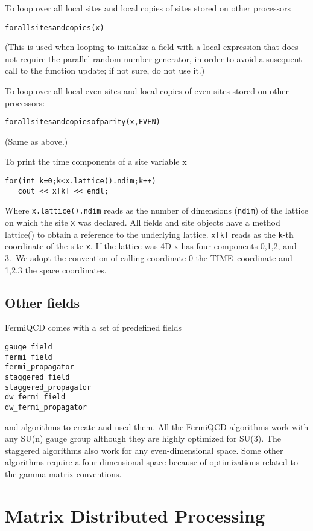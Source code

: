To loop over all local sites and local copies of sites stored on other
processors
\begin{verbatim}
forallsitesandcopies(x)
\end{verbatim}

(This is used when looping to initialize a field with a local expression
that does not require the parallel random number generator, in order to
avoid a susequent call to the function update; if not sure, do not use it.)

To loop over all local even sites and local copies of even sites stored on
other processors:
\begin{verbatim}
forallsitesandcopiesofparity(x,EVEN)
\end{verbatim}

(Same as above.)

To print the time components of a site variable x
\begin{verbatim}
for(int k=0;k<x.lattice().ndim;k++)
   cout << x[k] << endl;
\end{verbatim}

Where {\tt x.lattice().ndim} reads as the number of dimensions ({\tt ndim})
of the lattice on which the site {\tt x} was declared. All fields and site
objects have a method lattice() to obtain a reference to the underlying
lattice. {\tt x[k]} reads as the {\tt k}-th coordinate of the site {\tt x}.
If the lattice was 4D x has four components 0,1,2, and 3.\ We adopt the
convention of calling coordinate 0 the TIME\ coordinate and 1,2,3 the space
coordinates.

\subsection{Other fields}

FermiQCD comes with a set of predefined fields
\begin{verbatim}
gauge_field
fermi_field
fermi_propagator
staggered_field
staggered_propagator
dw_fermi_field
dw_fermi_propagator
\end{verbatim}

and algorithms to create and used them. All the FermiQCD algorithms work
with any SU(n) gauge group although they are highly optimized for SU(3). The
staggered algorithms also work for any even-dimensional space. Some other
algorithms require a four dimensional space because of optimizations related
to the gamma matrix conventions.

\section{Matrix Distributed Processing}

